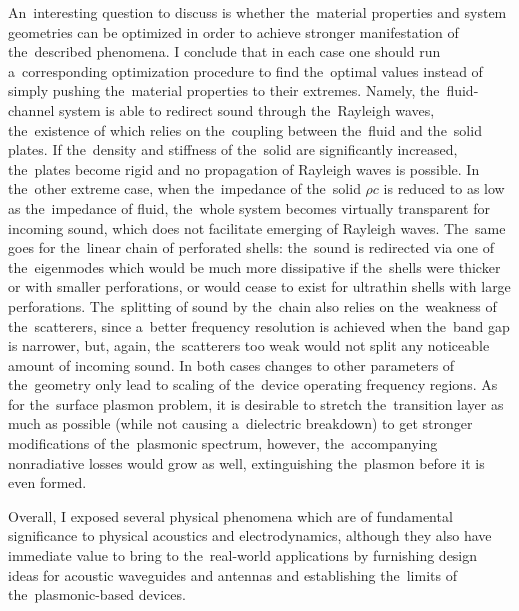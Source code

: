 An~interesting question to discuss is whether the~material properties and system geometries can be optimized in order to achieve stronger manifestation of the~described phenomena.
I conclude that in each case one should run a~corresponding optimization procedure to find the~optimal values instead of simply pushing the~material properties to their extremes.
Namely, the~fluid-channel system is able to redirect sound through the~Rayleigh waves, the~existence of which relies on the~coupling between the~fluid and the~solid plates.
If the~density and stiffness of the~solid are significantly increased, the~plates become rigid and no propagation of Rayleigh waves is possible.
In the~other extreme case, when the~impedance of the~solid $\rho c$ is reduced to as low as the~impedance of fluid, the~whole system becomes virtually transparent for incoming sound, which does not facilitate emerging of Rayleigh waves.
The~same goes for the~linear chain of perforated shells: the~sound is redirected via one of the~eigenmodes which would be much more dissipative if the~shells were thicker or with smaller perforations, or would cease to exist for ultrathin shells with large perforations.
The~splitting of sound by the~chain also relies on the~weakness of the~scatterers, since a~better frequency resolution is achieved when the~band gap is narrower, but, again, the~scatterers too weak would not split any noticeable amount of incoming sound.
In both cases changes to other parameters of the~geometry only lead to scaling of the~device operating frequency regions.
As for the~surface plasmon problem, it is desirable to stretch the~transition layer as much as possible (while not causing a~dielectric breakdown) to get stronger modifications of the~plasmonic spectrum, however, the~accompanying nonradiative losses would grow as well, extinguishing the~plasmon before it is even formed.

Overall, I exposed several physical phenomena which are of fundamental significance to physical acoustics and electrodynamics, although they also have immediate value to bring to the~real-world applications by furnishing design ideas for acoustic waveguides and antennas and establishing the~limits of the~plasmonic-based devices.

